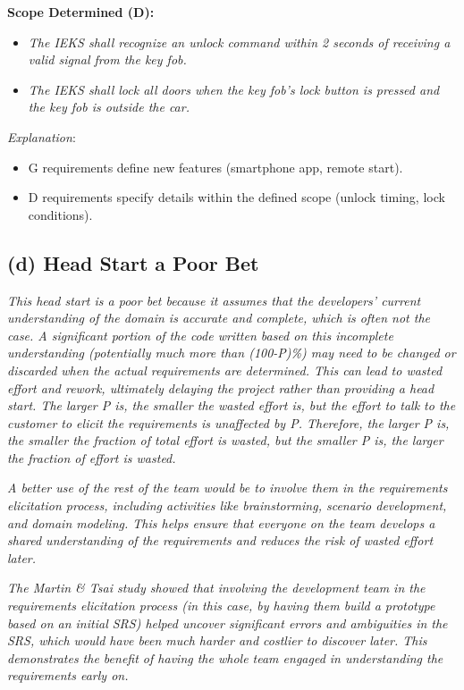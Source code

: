 \documentclass{article}
\begin{document}
\textbf{Scope Determined (D):}
\begin{itemize}
    \item \textit{The IEKS shall recognize an unlock command within 2 seconds of receiving a valid signal from the key fob.}
    \item \textit{The IEKS shall lock all doors when the key fob's lock button is pressed and the key fob is outside the car.}
\end{itemize}

\textit{Explanation}:
\begin{itemize}
    \item G requirements define new features (smartphone app, remote start).
    \item D requirements specify details within the defined scope (unlock timing, lock conditions).
\end{itemize}

\subsection*{(d) Head Start a Poor Bet}

\textit{This head start is a poor bet because it assumes that the developers' current understanding of the domain is accurate and complete, which is often not the case. A significant portion of the code written based on this incomplete understanding (potentially much more than (100-P)\%) may need to be changed or discarded when the actual requirements are determined. This can lead to wasted effort and rework, ultimately delaying the project rather than providing a head start. The larger P is, the smaller the wasted effort is, but the effort to talk to the customer to elicit the requirements is unaffected by P. Therefore, the larger P is, the smaller the fraction of total effort is wasted, but the smaller P is, the larger the fraction of effort is wasted. }

\textit{A better use of the rest of the team would be to involve them in the requirements elicitation process, including activities like brainstorming, scenario development, and domain modeling. This helps ensure that everyone on the team develops a shared understanding of the requirements and reduces the risk of wasted effort later.}

\textit{The Martin & Tsai study showed that involving the development team in the requirements elicitation process (in this case, by having them build a prototype based on an initial SRS) helped uncover significant errors and ambiguities in the SRS, which would have been much harder and costlier to discover later. This demonstrates the benefit of having the whole team engaged in understanding the requirements early on.}
\end{document}
